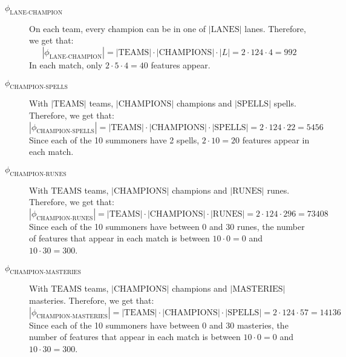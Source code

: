 \begin{description}
\item[{$\phi_{\text{LANE-CHAMPION}}$}]\hfill

On each team, every champion can be in one of $|\text{LANES}|$ lanes. Therefore, we get that:
\[|\phi_{\text{LANE-CHAMPION}}| = |\text{TEAMS}| \cdot |\text{CHAMPIONS}| \cdot |L| = 2 \cdot 124 \cdot 4 = 992\]
In each match, only $2 \cdot 5 \cdot 4 = 40$ features appear.


\item[{$\phi_{\text{CHAMPION-SPELLS}}$}]\hfill

With $|\text{TEAMS}|$ teams, $|\text{CHAMPIONS}|$ champions and $|\text{SPELLS}|$ spells. Therefore, we get that:
\[|\phi_{\text{CHAMPION-SPELLS}}| = |\text{TEAMS}| \cdot |\text{CHAMPIONS}| \cdot |\text{SPELLS}| = 2 \cdot 124 \cdot 22 = 5456\]
Since each of the 10 summoners have 2 spells, $2 \cdot 10 = 20$ features appear in each match.


\item[{$\phi_{\text{CHAMPION-RUNES}}$}]\hfill

With $\text{TEAMS}$ teams, $|\text{CHAMPIONS}|$ champions and $|\text{RUNES}|$ runes. Therefore, we get that:
\[|\phi_{\text{CHAMPION-RUNES}}| = |\text{TEAMS}| \cdot |\text{CHAMPIONS}| \cdot |\text{RUNES}| = 2 \cdot 124 \cdot 296 = 73408\]
Since each of the 10 summoners have between 0 and 30 runes, the number of features that appear in each match is between
$10 \cdot 0 = 0$ and $10 \cdot 30 = 300$.


\item[{$\phi_{\text{CHAMPION-MASTERIES}}$}]\hfill

With $\text{TEAMS}$ teams, $|\text{CHAMPIONS}|$ champions and $|\text{MASTERIES}|$ masteries. Therefore, we get that:
\[|\phi_{\text{CHAMPION-MASTERIES}}| = |\text{TEAMS}| \cdot |\text{CHAMPIONS}| \cdot |\text{SPELLS}| = 2 \cdot 124 \cdot 57 = 14136\]
Since each of the 10 summoners have between 0 and 30 masteries, the number of features that appear in each match is between
$10 \cdot 0 = 0$ and $10 \cdot 30 = 300$.
\end{description}




